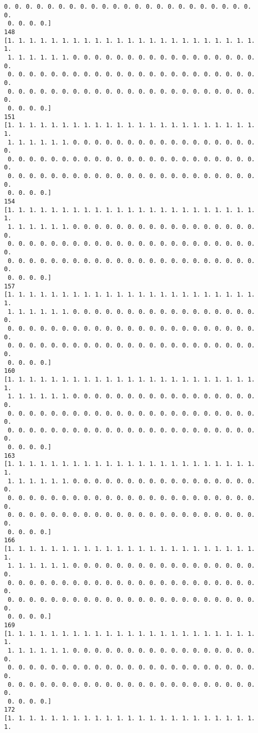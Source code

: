 \documentclass[11pt]{article}
\begin{document}
\begin{Verbatim}[commandchars=\\\{\}]
 0. 0. 0. 0. 0. 0. 0. 0. 0. 0. 0. 0. 0. 0. 0. 0. 0. 0. 0. 0. 0. 0. 0. 0.
 0. 0. 0. 0.]
148
[1. 1. 1. 1. 1. 1. 1. 1. 1. 1. 1. 1. 1. 1. 1. 1. 1. 1. 1. 1. 1. 1. 1. 1.
 1. 1. 1. 1. 1. 1. 0. 0. 0. 0. 0. 0. 0. 0. 0. 0. 0. 0. 0. 0. 0. 0. 0. 0.
 0. 0. 0. 0. 0. 0. 0. 0. 0. 0. 0. 0. 0. 0. 0. 0. 0. 0. 0. 0. 0. 0. 0. 0.
 0. 0. 0. 0. 0. 0. 0. 0. 0. 0. 0. 0. 0. 0. 0. 0. 0. 0. 0. 0. 0. 0. 0. 0.
 0. 0. 0. 0.]
151
[1. 1. 1. 1. 1. 1. 1. 1. 1. 1. 1. 1. 1. 1. 1. 1. 1. 1. 1. 1. 1. 1. 1. 1.
 1. 1. 1. 1. 1. 1. 0. 0. 0. 0. 0. 0. 0. 0. 0. 0. 0. 0. 0. 0. 0. 0. 0. 0.
 0. 0. 0. 0. 0. 0. 0. 0. 0. 0. 0. 0. 0. 0. 0. 0. 0. 0. 0. 0. 0. 0. 0. 0.
 0. 0. 0. 0. 0. 0. 0. 0. 0. 0. 0. 0. 0. 0. 0. 0. 0. 0. 0. 0. 0. 0. 0. 0.
 0. 0. 0. 0.]
154
[1. 1. 1. 1. 1. 1. 1. 1. 1. 1. 1. 1. 1. 1. 1. 1. 1. 1. 1. 1. 1. 1. 1. 1.
 1. 1. 1. 1. 1. 1. 0. 0. 0. 0. 0. 0. 0. 0. 0. 0. 0. 0. 0. 0. 0. 0. 0. 0.
 0. 0. 0. 0. 0. 0. 0. 0. 0. 0. 0. 0. 0. 0. 0. 0. 0. 0. 0. 0. 0. 0. 0. 0.
 0. 0. 0. 0. 0. 0. 0. 0. 0. 0. 0. 0. 0. 0. 0. 0. 0. 0. 0. 0. 0. 0. 0. 0.
 0. 0. 0. 0.]
157
[1. 1. 1. 1. 1. 1. 1. 1. 1. 1. 1. 1. 1. 1. 1. 1. 1. 1. 1. 1. 1. 1. 1. 1.
 1. 1. 1. 1. 1. 1. 0. 0. 0. 0. 0. 0. 0. 0. 0. 0. 0. 0. 0. 0. 0. 0. 0. 0.
 0. 0. 0. 0. 0. 0. 0. 0. 0. 0. 0. 0. 0. 0. 0. 0. 0. 0. 0. 0. 0. 0. 0. 0.
 0. 0. 0. 0. 0. 0. 0. 0. 0. 0. 0. 0. 0. 0. 0. 0. 0. 0. 0. 0. 0. 0. 0. 0.
 0. 0. 0. 0.]
160
[1. 1. 1. 1. 1. 1. 1. 1. 1. 1. 1. 1. 1. 1. 1. 1. 1. 1. 1. 1. 1. 1. 1. 1.
 1. 1. 1. 1. 1. 1. 0. 0. 0. 0. 0. 0. 0. 0. 0. 0. 0. 0. 0. 0. 0. 0. 0. 0.
 0. 0. 0. 0. 0. 0. 0. 0. 0. 0. 0. 0. 0. 0. 0. 0. 0. 0. 0. 0. 0. 0. 0. 0.
 0. 0. 0. 0. 0. 0. 0. 0. 0. 0. 0. 0. 0. 0. 0. 0. 0. 0. 0. 0. 0. 0. 0. 0.
 0. 0. 0. 0.]
163
[1. 1. 1. 1. 1. 1. 1. 1. 1. 1. 1. 1. 1. 1. 1. 1. 1. 1. 1. 1. 1. 1. 1. 1.
 1. 1. 1. 1. 1. 1. 0. 0. 0. 0. 0. 0. 0. 0. 0. 0. 0. 0. 0. 0. 0. 0. 0. 0.
 0. 0. 0. 0. 0. 0. 0. 0. 0. 0. 0. 0. 0. 0. 0. 0. 0. 0. 0. 0. 0. 0. 0. 0.
 0. 0. 0. 0. 0. 0. 0. 0. 0. 0. 0. 0. 0. 0. 0. 0. 0. 0. 0. 0. 0. 0. 0. 0.
 0. 0. 0. 0.]
166
[1. 1. 1. 1. 1. 1. 1. 1. 1. 1. 1. 1. 1. 1. 1. 1. 1. 1. 1. 1. 1. 1. 1. 1.
 1. 1. 1. 1. 1. 1. 0. 0. 0. 0. 0. 0. 0. 0. 0. 0. 0. 0. 0. 0. 0. 0. 0. 0.
 0. 0. 0. 0. 0. 0. 0. 0. 0. 0. 0. 0. 0. 0. 0. 0. 0. 0. 0. 0. 0. 0. 0. 0.
 0. 0. 0. 0. 0. 0. 0. 0. 0. 0. 0. 0. 0. 0. 0. 0. 0. 0. 0. 0. 0. 0. 0. 0.
 0. 0. 0. 0.]
169
[1. 1. 1. 1. 1. 1. 1. 1. 1. 1. 1. 1. 1. 1. 1. 1. 1. 1. 1. 1. 1. 1. 1. 1.
 1. 1. 1. 1. 1. 1. 0. 0. 0. 0. 0. 0. 0. 0. 0. 0. 0. 0. 0. 0. 0. 0. 0. 0.
 0. 0. 0. 0. 0. 0. 0. 0. 0. 0. 0. 0. 0. 0. 0. 0. 0. 0. 0. 0. 0. 0. 0. 0.
 0. 0. 0. 0. 0. 0. 0. 0. 0. 0. 0. 0. 0. 0. 0. 0. 0. 0. 0. 0. 0. 0. 0. 0.
 0. 0. 0. 0.]
172
[1. 1. 1. 1. 1. 1. 1. 1. 1. 1. 1. 1. 1. 1. 1. 1. 1. 1. 1. 1. 1. 1. 1. 1.

\end{Verbatim}
\end{document}
